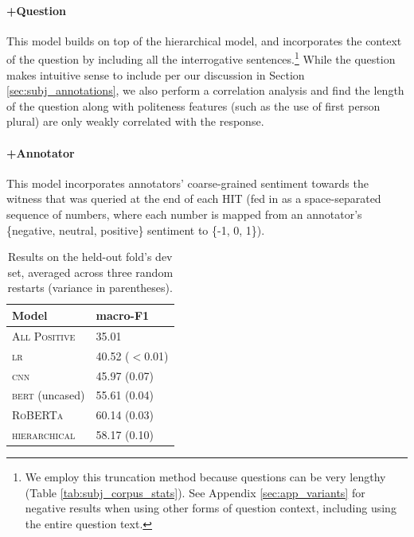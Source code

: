 \paragraph{+Question} This model builds on top of the hierarchical model, and incorporates the context of the question by including all the interrogative sentences.\footnote{We employ this truncation method because questions can be very lengthy (Table \ref{tab:subj_corpus_stats}). See Appendix \ref{sec:app_variants} for negative results when using other forms of question context, including using the entire question text.} While the question makes intuitive sense to include per our discussion in Section \ref{sec:subj_annotations}, we also perform a correlation analysis and find the length of the question along with politeness features (such as the use of first person plural) are only weakly correlated with the response.

\paragraph{+Annotator} This model incorporates annotators' coarse-grained sentiment towards the witness that was queried at the end of each HIT (fed in as a space-separated sequence of numbers, where each number is mapped from an annotator's \{negative, neutral, positive\} sentiment to \{-1, 0, 1\}). 


\begin{table}
\centering
\small
\begin{tabular}{ll}
\toprule
Model  &macro-F1\\ 
\midrule
\textsc{All Positive} &35.01 \\
\textsc{lr} &40.52 ($<$0.01) \\
\textsc{cnn} &45.97 (0.07)\\
\midrule
\textsc{bert} (uncased) &55.61 (0.04)\\
\textsc{RoBERTa} &60.14 (0.03)\\
\textsc{hierarchical} &58.17 (0.10)\\
\bottomrule
\end{tabular}
\vspace{-.3em}
\caption{Results on the held-out fold's dev set, averaged across three random restarts (variance in parentheses).}
\label{tab:subj_base_results}
\end{table}

